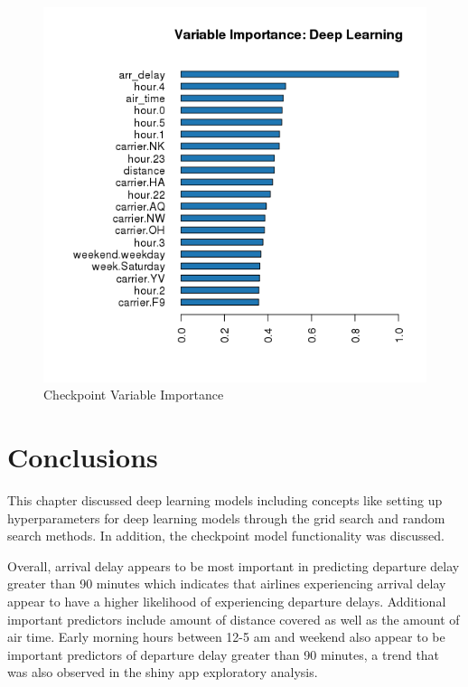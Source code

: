 \documentclass[12pt,twoside]{amherstthesis}
\begin{document}
  \begin{figure}[htbp]
  \centering
  \includegraphics[scale = 0.9,angle = 0]{figure/VarImportCheckpoint.png}
  \caption[Checkpoint Variable Importance]{\normalsize{Checkpoint Variable Importance}}
  \label{fig:Hyarn17}
  \end{figure}
  
  \clearpage 
  
  \section{Conclusions}\label{conclusions}
  
  This chapter discussed deep learning models including concepts like
  setting up hyperparameters for deep learning models through the grid
  search and random search methods. In addition, the checkpoint model
  functionality was discussed.
  
  Overall, arrival delay appears to be most important in predicting
  departure delay greater than 90 minutes which indicates that airlines
  experiencing arrival delay appear to have a higher likelihood of
  experiencing departure delays. Additional important predictors include
  amount of distance covered as well as the amount of air time. Early
  morning hours between 12-5 am and weekend also appear to be important
  predictors of departure delay greater than 90 minutes, a trend that was
  also observed in the shiny app exploratory analysis.
  
\end{document}

